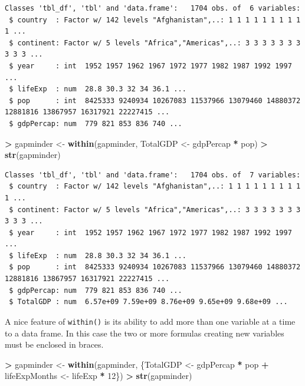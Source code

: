\documentclass[
]{krantz}
\makeatletter
\newenvironment{Shaded}{\begin{snugshade}}{\end{snugshade}}
\newcommand{\DecValTok}[1]{\textcolor[rgb]{0.06,0.06,0.06}{#1}}
\newcommand{\KeywordTok}[1]{\textcolor[rgb]{0.27,0.27,0.27}{\textbf{#1}}}
\newcommand{\NormalTok}[1]{#1}
\newcommand{\OperatorTok}[1]{\textcolor[rgb]{0.43,0.43,0.43}{\textbf{#1}}}
\newcommand{\StringTok}[1]{\textcolor[rgb]{0.5,0.5,0.5}{#1}}
\newenvironment{kframe}{%
\medskip{}
\setlength{\fboxsep}{.8em}
 \def\at@end@of@kframe{}%
 \ifinner\ifhmode%
  \def\at@end@of@kframe{\end{minipage}}%
  \begin{minipage}{\columnwidth}%
 \fi\fi%
 \def\FrameCommand##1{\hskip\@totalleftmargin \hskip-\fboxsep
 \colorbox{shadecolor}{##1}\hskip-\fboxsep
     \hskip-\linewidth \hskip-\@totalleftmargin \hskip\columnwidth}%
 \MakeFramed {\advance\hsize-\width
   \@totalleftmargin\z@ \linewidth\hsize
   \@setminipage}}%
 {\par\unskip\endMakeFramed%
 \at@end@of@kframe}
\renewenvironment{Shaded}{\begin{kframe}}{\end{kframe}}
\makeatother
\begin{document}
\begin{verbatim}
Classes 'tbl_df', 'tbl' and 'data.frame':   1704 obs. of  6 variables:
 $ country  : Factor w/ 142 levels "Afghanistan",..: 1 1 1 1 1 1 1 1 1 1 ...
 $ continent: Factor w/ 5 levels "Africa","Americas",..: 3 3 3 3 3 3 3 3 3 3 ...
 $ year     : int  1952 1957 1962 1967 1972 1977 1982 1987 1992 1997 ...
 $ lifeExp  : num  28.8 30.3 32 34 36.1 ...
 $ pop      : int  8425333 9240934 10267083 11537966 13079460 14880372 12881816 13867957 16317921 22227415 ...
 $ gdpPercap: num  779 821 853 836 740 ...
\end{verbatim}

\begin{Shaded}
\begin{Highlighting}[]
\OperatorTok{\textgreater{}}\StringTok{ }\NormalTok{gapminder \textless{}{-}}\StringTok{ }\KeywordTok{within}\NormalTok{(gapminder, TotalGDP \textless{}{-}}\StringTok{ }\NormalTok{gdpPercap }\OperatorTok{*}\StringTok{ }\NormalTok{pop)}
\OperatorTok{\textgreater{}}\StringTok{ }\KeywordTok{str}\NormalTok{(gapminder)}
\end{Highlighting}
\end{Shaded}

\begin{verbatim}
Classes 'tbl_df', 'tbl' and 'data.frame':   1704 obs. of  7 variables:
 $ country  : Factor w/ 142 levels "Afghanistan",..: 1 1 1 1 1 1 1 1 1 1 ...
 $ continent: Factor w/ 5 levels "Africa","Americas",..: 3 3 3 3 3 3 3 3 3 3 ...
 $ year     : int  1952 1957 1962 1967 1972 1977 1982 1987 1992 1997 ...
 $ lifeExp  : num  28.8 30.3 32 34 36.1 ...
 $ pop      : int  8425333 9240934 10267083 11537966 13079460 14880372 12881816 13867957 16317921 22227415 ...
 $ gdpPercap: num  779 821 853 836 740 ...
 $ TotalGDP : num  6.57e+09 7.59e+09 8.76e+09 9.65e+09 9.68e+09 ...
\end{verbatim}

A nice feature of \texttt{within()} is its ability to add more than one variable at a time to a data frame. In this case the two or more formulas creating new variables must be enclosed in braces.

\begin{Shaded}
\begin{Highlighting}[]
\OperatorTok{\textgreater{}}\StringTok{ }\NormalTok{gapminder \textless{}{-}}\StringTok{ }\KeywordTok{within}\NormalTok{(gapminder, \{TotalGDP \textless{}{-}}\StringTok{ }\NormalTok{gdpPercap }\OperatorTok{*}\StringTok{ }\NormalTok{pop}
\OperatorTok{+}\StringTok{     }\NormalTok{lifeExpMonths \textless{}{-}}\StringTok{ }\NormalTok{lifeExp }\OperatorTok{*}\StringTok{ }\DecValTok{12}\NormalTok{\})}
\OperatorTok{\textgreater{}}\StringTok{ }\KeywordTok{str}\NormalTok{(gapminder)}
\end{Highlighting}
\end{Shaded}
\end{document}
